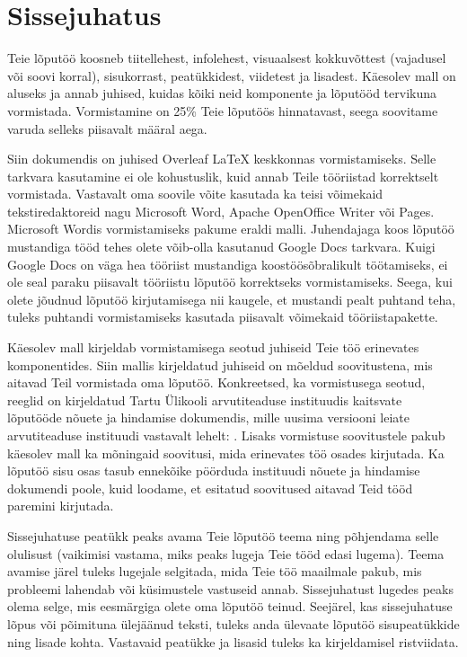 \section{Sissejuhatus} \label{sissejuhatus}

Teie lõputöö koosneb tiitellehest, infolehest, visuaalsest kokkuvõttest (vajadusel või soovi korral), sisukorrast, peatükkidest, viidetest ja lisadest. Käesolev mall on aluseks ja annab juhised, kuidas kõiki neid komponente ja lõputööd tervikuna vormistada. Vormistamine on 25\% Teie lõputöös hinnatavast, seega soovitame varuda selleks piisavalt määral aega.

Siin dokumendis on juhised Overleaf LaTeX keskkonnas vormistamiseks. Selle tarkvara kasutamine ei ole kohustuslik, kuid annab Teile tööriistad korrektselt vormistada. Vastavalt oma soovile võite kasutada ka teisi võimekaid tekstiredaktoreid nagu Microsoft Word, Apache OpenOffice Writer või Pages. Microsoft Wordis vormistamiseks pakume eraldi malli. Juhendajaga koos lõputöö mustandiga tööd tehes olete võib-olla kasutanud Google Docs tarkvara. Kuigi Google Docs on väga hea tööriist mustandiga koostöösõbralikult töötamiseks, ei ole seal paraku piisavalt tööriistu lõputöö korrektseks vormistamiseks. Seega, kui olete jõudnud lõputöö kirjutamisega nii kaugele, et mustandi pealt puhtand teha, tuleks puhtandi vormistamiseks kasutada piisavalt võimekaid tööriistapakette.

Käesolev mall kirjeldab vormistamisega seotud juhiseid Teie töö erinevates komponentides. Siin mallis kirjeldatud juhiseid on mõeldud soovitustena, mis aitavad Teil vormistada oma lõputöö. Konkreetsed, ka vormistusega seotud, reeglid on kirjeldatud Tartu Ülikooli arvutiteaduse instituudis kaitsvate lõputööde nõuete ja hindamise dokumendis, mille uusima versiooni leiate arvutiteaduse instituudi vastavalt lehelt: .
Lisaks vormistuse soovitustele pakub käesolev mall ka mõningaid soovitusi, mida erinevates töö osades kirjutada. Ka lõputöö sisu osas tasub ennekõike pöörduda instituudi nõuete ja hindamise dokumendi poole, kuid loodame, et esitatud soovitused aitavad Teid tööd paremini kirjutada.

Sissejuhatuse peatükk peaks avama Teie lõputöö teema ning põhjendama selle olulisust (vaikimisi vastama, miks peaks lugeja Teie tööd edasi lugema). Teema avamise järel tuleks lugejale selgitada, mida Teie töö maailmale pakub, mis probleemi lahendab või küsimustele vastuseid annab. Sissejuhatust lugedes peaks olema selge, mis eesmärgiga olete oma lõputöö teinud. Seejärel, kas sissejuhatuse lõpus või põimituna ülejäänud teksti, tuleks anda ülevaate lõputöö sisupeatükkide ning lisade kohta. Vastavaid peatükke ja lisasid tuleks ka kirjeldamisel ristviidata.

